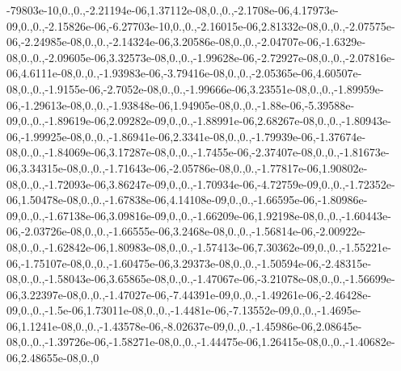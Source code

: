 \begin{DoxyCompactItemize}
-79803e-\/10,0.,0.,-\/2.\-21194e-\/06,1.\-37112e-\/08,0.,0.,-\/2.\-1708e-\/06,4.\-17973e-\/09,0.,0.,-\/2.\-15826e-\/06,-\/6.\-27703e-\/10,0.,0.,-\/2.\-16015e-\/06,2.\-81332e-\/08,0.,0.,-\/2.\-07575e-\/06,-\/2.\-24985e-\/08,0.,0.,-\/2.\-14324e-\/06,3.\-20586e-\/08,0.,0.,-\/2.\-04707e-\/06,-\/1.\-6329e-\/08,0.,0.,-\/2.\-09605e-\/06,3.\-32573e-\/08,0.,0.,-\/1.\-99628e-\/06,-\/2.\-72927e-\/08,0.,0.,-\/2.\-07816e-\/06,4.\-6111e-\/08,0.,0.,-\/1.\-93983e-\/06,-\/3.\-79416e-\/08,0.,0.,-\/2.\-05365e-\/06,4.\-60507e-\/08,0.,0.,-\/1.\-9155e-\/06,-\/2.\-7052e-\/08,0.,0.,-\/1.\-99666e-\/06,3.\-23551e-\/08,0.,0.,-\/1.\-89959e-\/06,-\/1.\-29613e-\/08,0.,0.,-\/1.\-93848e-\/06,1.\-94905e-\/08,0.,0.,-\/1.\-88e-\/06,-\/5.\-39588e-\/09,0.,0.,-\/1.\-89619e-\/06,2.\-09282e-\/09,0.,0.,-\/1.\-88991e-\/06,2.\-68267e-\/08,0.,0.,-\/1.\-80943e-\/06,-\/1.\-99925e-\/08,0.,0.,-\/1.\-86941e-\/06,2.\-3341e-\/08,0.,0.,-\/1.\-79939e-\/06,-\/1.\-37674e-\/08,0.,0.,-\/1.\-84069e-\/06,3.\-17287e-\/08,0.,0.,-\/1.\-7455e-\/06,-\/2.\-37407e-\/08,0.,0.,-\/1.\-81673e-\/06,3.\-34315e-\/08,0.,0.,-\/1.\-71643e-\/06,-\/2.\-05786e-\/08,0.,0.,-\/1.\-77817e-\/06,1.\-90802e-\/08,0.,0.,-\/1.\-72093e-\/06,3.\-86247e-\/09,0.,0.,-\/1.\-70934e-\/06,-\/4.\-72759e-\/09,0.,0.,-\/1.\-72352e-\/06,1.\-50478e-\/08,0.,0.,-\/1.\-67838e-\/06,4.\-14108e-\/09,0.,0.,-\/1.\-66595e-\/06,-\/1.\-80986e-\/09,0.,0.,-\/1.\-67138e-\/06,3.\-09816e-\/09,0.,0.,-\/1.\-66209e-\/06,1.\-92198e-\/08,0.,0.,-\/1.\-60443e-\/06,-\/2.\-03726e-\/08,0.,0.,-\/1.\-66555e-\/06,3.\-2468e-\/08,0.,0.,-\/1.\-56814e-\/06,-\/2.\-00922e-\/08,0.,0.,-\/1.\-62842e-\/06,1.\-80983e-\/08,0.,0.,-\/1.\-57413e-\/06,7.\-30362e-\/09,0.,0.,-\/1.\-55221e-\/06,-\/1.\-75107e-\/08,0.,0.,-\/1.\-60475e-\/06,3.\-29373e-\/08,0.,0.,-\/1.\-50594e-\/06,-\/2.\-48315e-\/08,0.,0.,-\/1.\-58043e-\/06,3.\-65865e-\/08,0.,0.,-\/1.\-47067e-\/06,-\/3.\-21078e-\/08,0.,0.,-\/1.\-56699e-\/06,3.\-22397e-\/08,0.,0.,-\/1.\-47027e-\/06,-\/7.\-44391e-\/09,0.,0.,-\/1.\-49261e-\/06,-\/2.\-46428e-\/09,0.,0.,-\/1.\-5e-\/06,1.\-73011e-\/08,0.,0.,-\/1.\-4481e-\/06,-\/7.\-13552e-\/09,0.,0.,-\/1.\-4695e-\/06,1.\-1241e-\/08,0.,0.,-\/1.\-43578e-\/06,-\/8.\-02637e-\/09,0.,0.,-\/1.\-45986e-\/06,2.\-08645e-\/08,0.,0.,-\/1.\-39726e-\/06,-\/1.\-58271e-\/08,0.,0.,-\/1.\-44475e-\/06,1.\-26415e-\/08,0.,0.,-\/1.\-40682e-\/06,2.\-48655e-\/08,0.,0
\end{DoxyCompactItemize}
